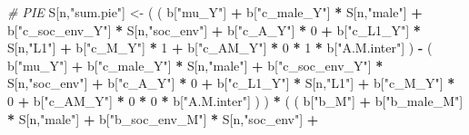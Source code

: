 \documentclass[
]{book}
\newenvironment{Shaded}{\begin{snugshade}}{\end{snugshade}}
\newcommand{\CommentTok}[1]{\textcolor[rgb]{0.56,0.35,0.01}{\textit{#1}}}
\newcommand{\DecValTok}[1]{\textcolor[rgb]{0.00,0.00,0.81}{#1}}
\newcommand{\NormalTok}[1]{#1}
\newcommand{\OtherTok}[1]{\textcolor[rgb]{0.56,0.35,0.01}{#1}}
\newcommand{\SpecialCharTok}[1]{\textcolor[rgb]{0.81,0.36,0.00}{\textbf{#1}}}
\newcommand{\StringTok}[1]{\textcolor[rgb]{0.31,0.60,0.02}{#1}}
\begin{document}
\begin{Shaded}
\begin{Highlighting}[]
    \CommentTok{\# PIE }
\NormalTok{    S[n,}\StringTok{"sum.pie"}\NormalTok{] }\OtherTok{\textless{}{-}}\NormalTok{ ( ( b[}\StringTok{"mu\_Y"}\NormalTok{] }\SpecialCharTok{+} 
\NormalTok{                            b[}\StringTok{"c\_male\_Y"}\NormalTok{] }\SpecialCharTok{*}\NormalTok{ S[n,}\StringTok{"male"}\NormalTok{] }\SpecialCharTok{+} 
\NormalTok{                            b[}\StringTok{"c\_soc\_env\_Y"}\NormalTok{] }\SpecialCharTok{*}\NormalTok{ S[n,}\StringTok{"soc\_env"}\NormalTok{] }\SpecialCharTok{+} 
\NormalTok{                            b[}\StringTok{"c\_A\_Y"}\NormalTok{] }\SpecialCharTok{*} \DecValTok{0} \SpecialCharTok{+} 
\NormalTok{                            b[}\StringTok{"c\_L1\_Y"}\NormalTok{] }\SpecialCharTok{*}\NormalTok{ S[n,}\StringTok{"L1"}\NormalTok{] }\SpecialCharTok{+}
\NormalTok{                            b[}\StringTok{"c\_M\_Y"}\NormalTok{] }\SpecialCharTok{*} \DecValTok{1} \SpecialCharTok{+}
\NormalTok{                            b[}\StringTok{"c\_AM\_Y"}\NormalTok{] }\SpecialCharTok{*} \DecValTok{0} \SpecialCharTok{*} \DecValTok{1} \SpecialCharTok{*}\NormalTok{ b[}\StringTok{"A.M.inter"}\NormalTok{] ) }\SpecialCharTok{{-}} 
\NormalTok{                          ( b[}\StringTok{"mu\_Y"}\NormalTok{] }\SpecialCharTok{+} 
\NormalTok{                              b[}\StringTok{"c\_male\_Y"}\NormalTok{] }\SpecialCharTok{*}\NormalTok{ S[n,}\StringTok{"male"}\NormalTok{] }\SpecialCharTok{+} 
\NormalTok{                              b[}\StringTok{"c\_soc\_env\_Y"}\NormalTok{] }\SpecialCharTok{*}\NormalTok{ S[n,}\StringTok{"soc\_env"}\NormalTok{] }\SpecialCharTok{+} 
\NormalTok{                              b[}\StringTok{"c\_A\_Y"}\NormalTok{] }\SpecialCharTok{*} \DecValTok{0} \SpecialCharTok{+} 
\NormalTok{                              b[}\StringTok{"c\_L1\_Y"}\NormalTok{] }\SpecialCharTok{*}\NormalTok{ S[n,}\StringTok{"L1"}\NormalTok{] }\SpecialCharTok{+}
\NormalTok{                              b[}\StringTok{"c\_M\_Y"}\NormalTok{] }\SpecialCharTok{*} \DecValTok{0} \SpecialCharTok{+}
\NormalTok{                              b[}\StringTok{"c\_AM\_Y"}\NormalTok{] }\SpecialCharTok{*} \DecValTok{0} \SpecialCharTok{*} \DecValTok{0} \SpecialCharTok{*}\NormalTok{ b[}\StringTok{"A.M.inter"}\NormalTok{] ) ) }\SpecialCharTok{*}
\NormalTok{      ( ( b[}\StringTok{"b\_M"}\NormalTok{] }\SpecialCharTok{+} 
\NormalTok{            b[}\StringTok{"b\_male\_M"}\NormalTok{] }\SpecialCharTok{*}\NormalTok{ S[n,}\StringTok{"male"}\NormalTok{] }\SpecialCharTok{+} 
\NormalTok{            b[}\StringTok{"b\_soc\_env\_M"}\NormalTok{] }\SpecialCharTok{*}\NormalTok{ S[n,}\StringTok{"soc\_env"}\NormalTok{] }\SpecialCharTok{+} 

\end{Highlighting}
\end{Shaded}
\end{document}
